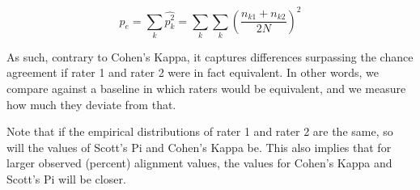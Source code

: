 \begin{equation}
p_e = \sum_k \widehat{p_k^2} = \sum_k \sum_k (\frac{n_{k1} + n_{k2}}{2N})^2
\end{equation}

As such, contrary to Cohen's Kappa, it captures differences surpassing the chance agreement if rater 1 and rater 2 were in fact equivalent.
In other words, we compare against a baseline in which raters would be equivalent, and we measure how much they deviate from that.

Note that if the empirical distributions of rater 1 and rater 2 are the same, so will the values of Scott's Pi and Cohen's Kappa be.
This also implies that for larger observed (percent) alignment values, the values for Cohen's Kappa and Scott's Pi will be closer.

